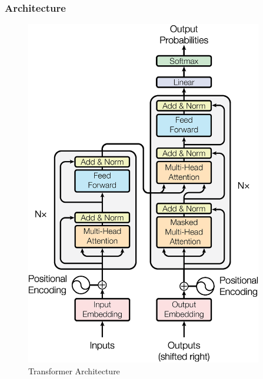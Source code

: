 \subsubsection{Architecture}

\begin{figure}[h]
\centerline{\includegraphics[height=6in]{figs/transformer.jpg}}
\caption[Transformer Architecture]{Transformer Architecture \cite{Vaswani2017}}
\label{fig:transformer_arch}
\end{figure}
